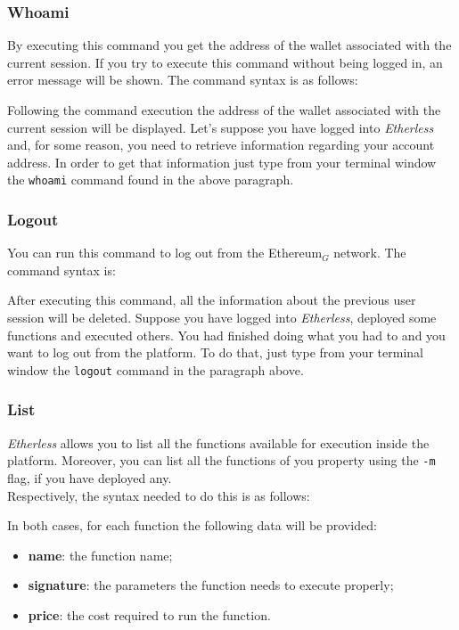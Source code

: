 \subsubsection{Whoami}
By executing this command you get the address of the wallet associated with the current session. If you try to execute this command without being logged in, an error message will be shown. The command syntax is as follows: 
\begin{center}
\end{center}
Following the command execution the address of the wallet associated with the current session will be displayed.
Let's suppose you have logged into \textit{Etherless} and, for some reason, you need to retrieve information regarding your account address. In order to get that information just type from your terminal window the \texttt{whoami} command found in the above paragraph.

\subsubsection{Logout}
You can run this command to log out from the Ethereum$_{G}$ network. The command syntax is:
\begin{center}
\end{center}
After executing this command, all the information about the previous user session will be deleted.
Suppose you have logged into \textit{Etherless}, deployed some functions and executed others. You had finished doing what you had to and you want to log out from the platform. To do that, just type from your terminal window the \texttt{logout} command in the paragraph above.

\subsubsection{List}\label{list}
\textit{Etherless} allows you to list all the functions available for execution inside the platform. Moreover, you can list all the functions of you property using the \texttt{-m} flag, if you have deployed any. \\
Respectively, the syntax needed to do this is as follows:
\begin{center}
\end{center}
\noindent In both cases, for each function the following data will be provided:
\begin{itemize}
	\item \textbf{name}: the function name;
	\item \textbf{signature}: the parameters the function needs to execute properly;
	\item \textbf{price}: the cost required to run the function.
\end{itemize}

